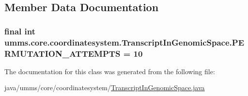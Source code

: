 \subsection{Member Data Documentation}
\hypertarget{classumms_1_1core_1_1coordinatesystem_1_1_transcript_in_genomic_space_a1b5bdda84f872c29a57c9d9772f2b988}{
\subsubsection[{P\+E\+R\+M\+U\+T\+A\+T\+I\+O\+N\+\_\+\+A\+T\+T\+E\+M\+P\+T\+S}]{\setlength{\rightskip}{0pt plus 5cm}final int umms.\+core.\+coordinatesystem.\+Transcript\+In\+Genomic\+Space.\+P\+E\+R\+M\+U\+T\+A\+T\+I\+O\+N\+\_\+\+A\+T\+T\+E\+M\+P\+T\+S = 10\hspace{0.3cm}{\ttfamily [static]}}}\label{classumms_1_1core_1_1coordinatesystem_1_1_transcript_in_genomic_space_a1b5bdda84f872c29a57c9d9772f2b988}


The documentation for this class was generated from the following file\+:\begin{DoxyCompactItemize}
\item 
java/umms/core/coordinatesystem/\hyperlink{_transcript_in_genomic_space_8java}{Transcript\+In\+Genomic\+Space.\+java}\end{DoxyCompactItemize}
